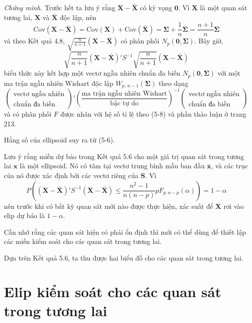\noindent\textit{Chứng minh.} Trước hết ta lưu ý rằng $\mathbf{X} - \bar{\mathbf{X}}$ có kỳ vọng $\mathbf{0}$. Vì $\mathbf{X}$ là một quan sát tương lai, $\mathbf{X}$ và $\bar{\mathbf{X}}$ độc lập, nên
\[
\text{Cov}(\mathbf{X} - \bar{\mathbf{X}}) = \text{Cov}(\mathbf{X}) + \text{Cov}(\bar{\mathbf{X}}) = \boldsymbol{\Sigma} + \frac{1}{n}\boldsymbol{\Sigma} = \frac{n+1}{n}\boldsymbol{\Sigma}
\]
và theo Kết quả 4.8, $\sqrt{\frac{n}{n+1}}(\mathbf{X} - \bar{\mathbf{X}})$ có phân phối $N_p(\mathbf{0}, \boldsymbol{\Sigma})$. Bây giờ,
\[
\sqrt{\frac{n}{n+1}} (\mathbf{X} - \bar{\mathbf{X}})' S^{-1} \sqrt{\frac{n}{n+1}} (\mathbf{X} - \bar{\mathbf{X}})
\]
biểu thức này kết hợp một vectơ ngẫu nhiên chuẩn đa biến $N_p(\mathbf{0}, \boldsymbol{\Sigma})$ với một ma trận ngẫu nhiên Wishart độc lập $W_{p,\,n-1}(\boldsymbol{\Sigma})$ theo dạng
\[
\left(\begin{array}{c}\text{vectơ ngẫu nhiên}\\ \text{chuẩn đa biến}\end{array}\right)'
\left(\frac{\text{ma trận ngẫu nhiên Wishart}}{\text{bậc tự do}}\right)^{-1}
\left(\begin{array}{c}\text{vectơ ngẫu nhiên}\\ \text{chuẩn đa biến}\end{array}\right)
\]
và có phân phối $F$ được nhân với hệ số tỉ lệ theo (5-8) và phần thảo luận ở trang 213. 

Hằng số của ellipsoid suy ra từ (5-6).

Lưu ý rằng miền dự báo trong Kết quả 5.6 cho một giá trị quan sát trong tương lai $\mathbf{x}$ là một ellipsoid. Nó có tâm tại vectơ trung bình mẫu ban đầu $\bar{\mathbf{x}}$, và các trục của nó được xác định bởi các vectơ riêng của $\mathbf{S}$. Vì
\[
P\left((\mathbf{X} - \bar{\mathbf{X}})' S^{-1} (\mathbf{X} - \bar{\mathbf{X}}) \le \frac{n^2-1}{n(n-p)} p F_{p, n-p}(\alpha)\right) = 1 - \alpha
\]
nên trước khi có bất kỳ quan sát mới nào được thực hiện, xác suất để $\mathbf{X}$ rơi vào elip dự báo là $1-\alpha$.

Cần nhớ rằng các quan sát hiện có phải ổn định thì mới có thể dùng để thiết lập các miền kiểm soát cho các quan sát trong tương lai.

Dựa trên Kết quả 5.6, ta thu được hai biểu đồ cho các quan sát trong tương lai.

\section*{Elip kiểm soát cho các quan sát trong tương lai}

